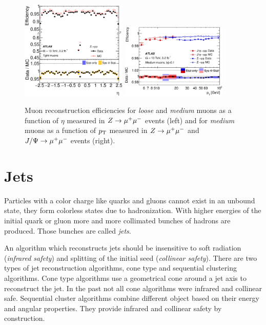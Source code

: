 \begin{figure}
    \begin{center}
        \includegraphics[width=0.45\textwidth,align=c]{./figures/object_selection/muon_efficiency_mediumloose_zmm.eps}
        \includegraphics[width=0.45\textwidth,align=c]{./figures/object_selection/muon_efficiency_medium_zmmjpsi.eps}
        \caption{Muon reconstruction efficiencies for \emph{loose} and \emph{medium} muons as a function of $\eta$
                measured in $Z \to \mu^+\mu^-$ events (left) and for \emph{medium} muons as a function of $p_\text{T}$ measured in
                $Z \to \mu^+\mu^-$ and $J/\Psi \to \mu^+\mu^-$ events (right).~\cite{PERF-2015-10}}\label{fig:object_selection:mu_id_eff}
    \end{center}
\end{figure}


\section{Jets}\label{sec:object_selection:jets}

Particles with a color charge like quarks and gluons cannot exist in an unbound state,
they form colorless states due to hadronization.
With higher energies of the initial quark or gluon more and more collimated bunches of hadrons are produced.
Those bunches are called \emph{jets}.

An algorithm which reconstructs jets should be insensitive to soft radiation (\emph{infrared safety})
and splitting of the initial seed (\emph{collinear safety}).
There are two types of jet reconstruction algorithms, cone type and sequential clustering algorithms.
Cone type algorithms use a geometrical cone around a jet axis to reconstruct the jet. In the past not
all cone algorithms were infrared and collinear safe.
Sequential cluster algorithms combine different object based on their energy and angular properties.
They provide infrared and collinear safety by construction.

